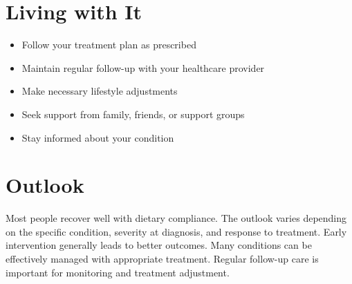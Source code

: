 \section{Living with It}
\begin{itemize}[noitemsep]
  \item Follow your treatment plan as prescribed
  \item Maintain regular follow-up with your healthcare provider
  \item Make necessary lifestyle adjustments
  \item Seek support from family, friends, or support groups
  \item Stay informed about your condition
\end{itemize}
\section{Outlook}
Most people recover well with dietary compliance. The outlook varies depending on the specific condition, severity at diagnosis, and response to treatment. Early intervention generally leads to better outcomes. Many conditions can be effectively managed with appropriate treatment. Regular follow-up care is important for monitoring and treatment adjustment.
